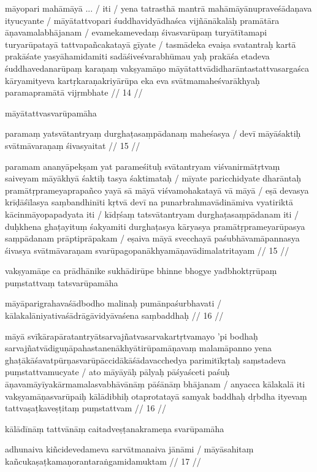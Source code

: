 māyopari mahāmāyā ...  /
iti  / yena tatrasthā mantrā mahāmāyānupraveśādaṇava ityucyante  / māyātattvopari śuddhavidyādhaśca vijñānākalāḥ pramātāra āṇavamalabhājanam  / evamekamevedaṃ śivasvarūpaṃ turyātītamapi turyarūpatayā tattvapañcakatayā gīyate  / tasmādeka evaiṣa svatantraḥ kartā prakāśate yasyāhamidamiti sadāśiveśvarabhūmau yaḥ prakāśa etadeva śuddhavedanarūpaṃ karaṇaṃ vakṣyamāṇo māyātattvādidharāntastattvasargaśca kāryamityeva kartṛkaraṇakriyārūpa eka eva svātmamaheśvarākhyaḥ paramapramātā vijṛmbhate  // 14  //

māyātattvasvarūpamāha

paramaṃ yatsvātantryaṃ durghaṭasaṃpādanaṃ maheśasya  /
devī māyāśaktiḥ svātmāvaraṇaṃ śivasyaitat  // 15  //

paramam ananyāpekṣam yat parameśituḥ svātantryam viśvanirmātṛtvaṃ saiveyam māyākhyā śaktiḥ tasya śaktimataḥ  / mīyate paricchidyate dharāntaḥ pramātṛprameyaprapañco yayā sā māyā viśvamohakatayā vā māyā  / eṣā devasya krīḍāśīlasya saṃbandhinīti kṛtvā devī na punarbrahmavādināmiva vyatiriktā kācinmāyopapadyata iti  / kīdṛśaṃ tatsvātantryam durghaṭasaṃpādanam iti  / duḥkhena ghaṭayituṃ śakyamiti durghaṭasya kāryasya pramātṛprameyarūpasya saṃpādanam prāptiprāpakam  / eṣaiva māyā svecchayā paśubhāvamāpannasya śivasya svātmāvaraṇam svarūpagopanākhyamāṇavādimalatritayam  // 15  //

vakṣyamāṇe ca prādhānike sukhādirūpe bhinne bhogye yadbhoktṛrūpaṃ puṃstattvaṃ tatsvarūpamāha

māyāparigrahavaśādbodho malinaḥ pumānpaśurbhavati  /
kālakalāniyativaśādrāgāvidyāvaśena saṃbaddhaḥ  // 16  //

māyā svīkārapāratantryātsarvajñatvasarvakartṛtvamayo 'pi bodhaḥ sarvajñatvādiguṇāpahastanenākhyātirūpamāṇavaṃ malamāpanno yena ghaṭākāśavatpūrṇasvarūpāccidākāśādavacchedya parimitīkṛtaḥ saṃstadeva puṃstattvamucyate  / ato māyāyāḥ pālyaḥ pāśyaśceti paśuḥ āṇavamāyīyakārmamalasvabhāvānāṃ pāśānāṃ bhājanam  / anyacca kālakalā iti vakṣyamāṇasvarūpaiḥ kālādibhiḥ otaprotatayā samyak baddhaḥ dṛbdha ityevaṃ tattvaṣaṭkaveṣṭitaṃ puṃstattvam  // 16  //

kālādīnāṃ tattvānāṃ caitadveṣṭanakrameṇa svarūpamāha

adhunaiva kiñcidevedameva sarvātmanaiva jānāmi  /
māyāsahitaṃ kañcukaṣaṭkamaṇorantaraṅgamidamuktam  // 17  //

